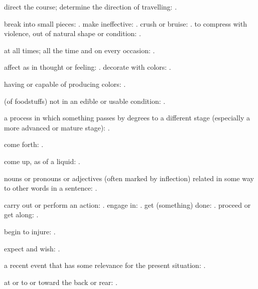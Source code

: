   direct the course; determine the direction of travelling:   .

  break into small pieces: . make ineffective:   . crush or bruise:   . to compress with violence, out of natural shape or condition:   .

  at all times; all the time and on every occasion:   .

  affect as in thought or feeling:   . decorate with colors:   .

  having or capable of producing colors:   .

  (of foodstuffs) not in an edible or usable condition:   .

  a process in which something passes by degrees to a different stage (especially a more advanced or mature stage):   .

  come forth:   .

  come up, as of a liquid:   .

  nouns or pronouns or adjectives (often marked by inflection) related in some way to other words in a sentence:   .

  carry out or perform an action:   . engage in:   . get (something) done:   . proceed or get along:   .

  begin to injure: .

  expect and wish:   .

  a recent event that has some relevance for the present situation: .

  at or to or toward the back or rear:   .


